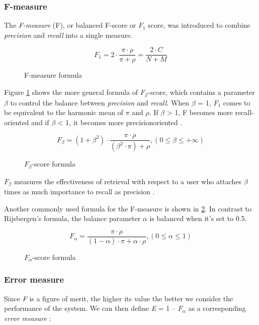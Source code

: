 \subsubsection{F-measure}
The \textit{F-measure} (F), or  balanced F-score or $\textit{F}_\textit{1}$ score, was introduced to combine \textit{precision} and \textit{recall} into a single measure.

\begin{figure}[H]
\begin{displaymath}
	F_1 = 2 \cdot \frac{\pi \cdot \rho}{\pi + \rho} = \frac{2 \cdot C}{N + M}
\end{displaymath}
\caption{F-measure formula}
\end{figure}

Figure \ref{fig:fbeta-score} shows the more general formula of $\textit{F}_\beta$-score, which contains a parameter $\beta$ to control the balance between \textit{precision} and \textit{recall}. When $\beta$ = 1, $\textit{F}_\textit{1}$ comes to be equivalent to the harmonic mean of $\pi$ and $\rho$. If $\beta$ > 1, F becomes more recall-oriented and if $\beta$ < 1, it becomes more precisionoriented \cite{Sasaki:2007}.

\begin{figure}[H]
\begin{displaymath}
	F_\beta = (1+\beta^2) \cdot \frac{\pi \cdot \rho}{(\beta^2 \cdot \pi) + \rho}, (0 \le \beta \le +\infty)
\end{displaymath}
\caption{$\textit{F}_\beta$-score formula \cite{Chinchor:1992}}
\label{fig:fbeta-score}
\end{figure}

$\textit{F}_\beta$ measures the effectiveness of retrieval with respect to a user who attaches $\beta$ times as much importance to recall as precision \cite{Rijsbergen:1979}.

Another commonly used formula for the F-measure is shown in \ref{fig:falpha-score}. In contrast to Rijsbergen's formula, the balance parameter $\alpha$ is balanced when it's set to 0.5.

\begin{figure}[H]
\begin{displaymath}
	F_\alpha = \frac{\pi \cdot \rho}{(1-\alpha) \cdot \pi + \alpha \cdot \rho}, (0 \le \alpha \le 1)
\end{displaymath}
\caption{$\textit{F}_\alpha$-score formula \cite{Makhoul:1999}}
\label{fig:falpha-score}
\end{figure}

\subsubsection{Error measure}
Since \textit{F} is a figure of merit, the higher its value the better we consider the performance of the system. We can then define \textit{E} = 1 – $F_\alpha$ as a corresponding \textit{error measure} \cite{Makhoul:1999}:

